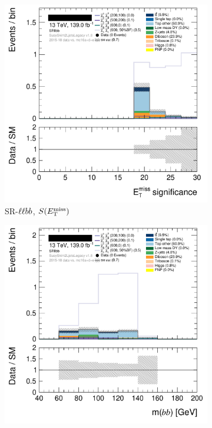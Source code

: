 \begin{figure}[tp]
\centering
\begin{subfigure}{0.48\textwidth}
\centering
\includegraphics[width=\textwidth]{figures/2ljets_def_met_Sign_SRllbb.png}
\caption{SR-$\ell\ell bb$, $S(E_\mathrm{T}^\mathrm{miss})$}
\end{subfigure}
\hfill
\begin{subfigure}{0.48\textwidth}
\centering
\includegraphics[width=\textwidth]{figures/2ljets_def_mbb_SRllbb.png}

\end{subfigure}
\end{figure}
